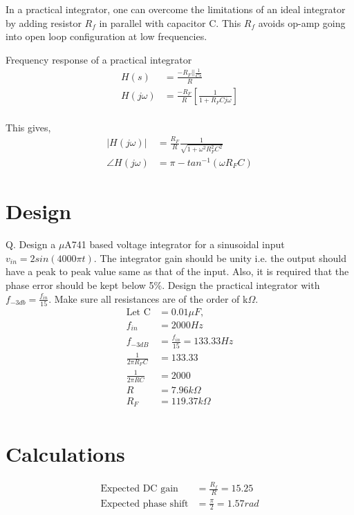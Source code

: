 \documentclass[12pt, titlepage]{article}
\theoremstyle{definition}
\begin{document}
    In a practical integrator, one can overcome the limitations of an ideal integrator by adding resistor $R_{f}$ in parallel with capacitor C.
    This $R_{f}$ avoids op-amp going into open loop configuration at low frequencies.

    Frequency response of a practical integrator
    \begin{align*}
    H(s) &=\frac{-R_{F} || \frac{1}{Cs}}{R} \\
    H(j\omega)&=\frac{-R_{F}}{R} \left[ \frac{1}{1+R_{F}Cj\omega} \right] \\
    \end{align*}

    This gives,
    \begin{align*}
    |H(j\omega)|&=\frac{R_{F}}{R}\frac{1}{\sqrt{1+\omega^{2}R_{F}^{2}C^{2}}} \\
    \angle H(j\omega) &= \pi - tan^{-1}(\omega R_{F}C)
    \end{align*}


  \newpage
  \section{Design}
    Q. Design a $\mu$A741 based voltage integrator for a sinusoidal input $v_{in} = 2sin(4000\pi t)$.
    The integrator gain should be unity i.e. the output should have a peak to peak value same as that of the input.
    Also, it is required that the phase error should be kept below 5\%.
    Design the practical integrator with $f_{-3db} = \frac{f_{in}}{15}$.
    Make sure all resistances are of the order of k$\Omega$.
   \begin{align*}
  \text{Let C} \! &=0.01\mu F , \\
  f_{in} &=2000 Hz\\
  f_{-3dB} &=\frac{f_{in}}{15} = 133.33 Hz \\
  \frac{1}{2\pi R_{F}C} &= 133.33\\
  \frac{1}{2\pi RC} &= 2000\\
  R &=7.96k\Omega\\
  R_{F} &=119.37k\Omega\\
  \end{align*}


  \section{Calculations}
  \begin{align*}
  \text{Expected DC gain} &= \frac{R_{f}}{R}=15.25\\
  \text{Expected phase shift} &= \frac{\pi}{2}=1.57 rad
  \end{align*}
\end{document}
